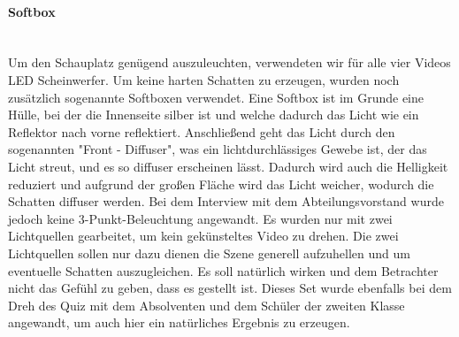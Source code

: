 \paragraph{Softbox}
\leavevmode \\
Um den Schauplatz genügend auszuleuchten, verwendeten wir für alle vier Videos LED Scheinwerfer. Um keine harten Schatten zu erzeugen, wurden noch zusätzlich
sogenannte Softboxen verwendet. Eine Softbox ist im Grunde eine Hülle, bei der
die Innenseite silber ist und welche dadurch das Licht wie ein Reflektor nach vorne
reflektiert. Anschließend geht das Licht durch den sogenannten "Front - Diffuser", was
ein lichtdurchlässiges Gewebe ist, der das Licht streut, und es so diffuser erscheinen
lässt. Dadurch wird auch die Helligkeit reduziert und aufgrund der großen Fläche wird das Licht weicher, wodurch die Schatten diffuser werden. \newline
Bei dem Interview mit dem Abteilungsvorstand wurde jedoch keine 3-Punkt-Beleuchtung angewandt. Es wurden nur mit zwei Lichtquellen gearbeitet, um kein gekünsteltes Video zu drehen. Die zwei Lichtquellen sollen nur dazu dienen die Szene generell aufzuhellen und um eventuelle Schatten auszugleichen. Es soll natürlich wirken und dem Betrachter nicht das Gefühl zu geben, dass es gestellt ist.  Dieses Set wurde ebenfalls bei dem Dreh des Quiz mit dem Absolventen und dem Schüler der zweiten Klasse angewandt, um auch hier ein natürliches Ergebnis zu erzeugen.
